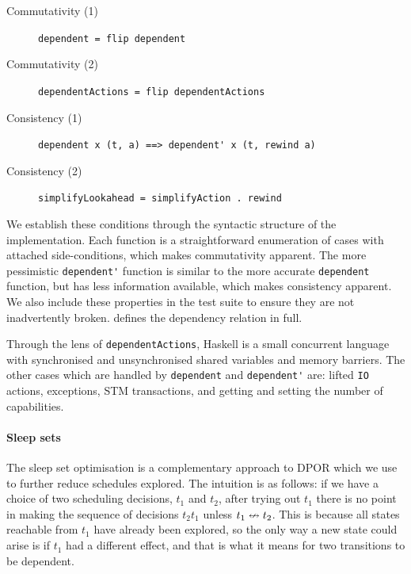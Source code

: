 \begin{description}
\item[Commutativity (1)]
  \verb|dependent = flip dependent|
\item[Commutativity (2)]
  \verb|dependentActions = flip dependentActions|
\item[Consistency (1)]
  \verb|dependent x (t, a) ==> dependent' x (t, rewind a)|
\item[Consistency (2)]
  \verb|simplifyLookahead = simplifyAction . rewind|
\end{description}

We establish these conditions through the syntactic structure of the
implementation.  Each function is a straightforward enumeration of
cases with attached side-conditions, which makes commutativity
apparent.  The more pessimistic \verb|dependent'| function is similar
to the more accurate \verb|dependent| function, but has less
information available, which makes consistency apparent.  We also
include these properties in the \dejafu{} test suite to ensure they
are not inadvertently broken.   defines the
dependency relation in full.

Through the lens of \verb|dependentActions|, Haskell is a small
concurrent language with synchronised and unsynchronised shared
variables and memory barriers.  The other cases which are handled by
\verb|dependent| and \verb|dependent'| are: lifted \verb|IO| actions,
exceptions, STM transactions, and getting and setting the number of
capabilities.

\paragraph{Sleep sets}
The sleep set optimisation\cite{godefroid1996} is a complementary
approach to DPOR which we use to further reduce schedules explored.
The intuition is as follows: if we have a choice of two scheduling
decisions, $t_{1}$ and $t_{2}$, after trying out $t_{1}$ there is no
point in making the sequence of decisions $t_{2}t_{1}$ unless
$t_{1} \nleftrightarrow t_{2}$.  This is because all states reachable from
$t_{1}$ have already been explored, so the only way a new state could
arise is if $t_{1}$ had a different effect, and that is what it means
for two transitions to be dependent.


